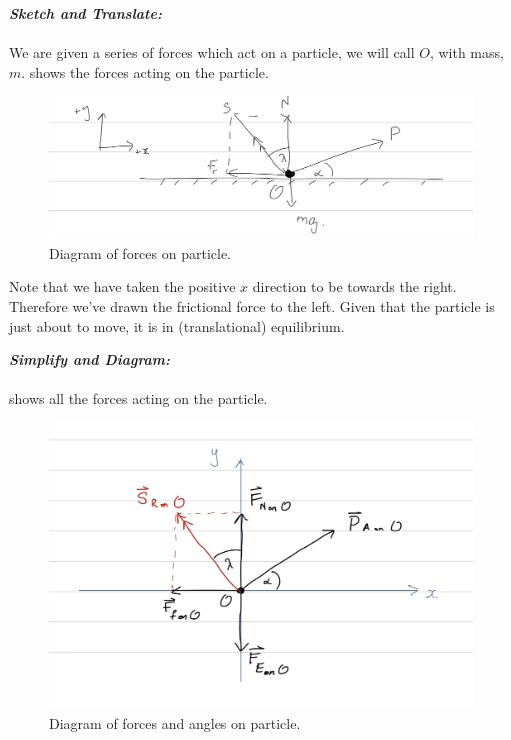 \begin{subquestions}
\begin{subsubquestions}
	\textbf{\textit{Sketch and Translate:}} \\ \\
	We are given a series of forces which act on a particle, we will call $O$, with mass, $m$.  shows the forces acting on the particle.
	\begin{figure} [H]
		\begin{center} 
			\includegraphics[scale=0.25]{../2014/figures/2014q55Sketch}
			\caption{\label{2014:q55:Force1} Diagram of forces on particle.}
		\end{center}
	\end{figure}
	
	Note that we have taken the positive $x$ direction to be towards the right. Therefore we've drawn the frictional force to the left. Given that the particle is just about to move, it is in (translational) equilibrium.
	
	\subsubquestion
	
	\textbf{\textit{Simplify and Diagram:}} \\ \\
	 shows all the forces acting on the particle.
	\begin{figure} [H]
		\begin{center} 
			\includegraphics[scale=0.25]{../2014/figures/2014q55Diagram}
			\caption{\label{2014:q55:Force2} Diagram of forces and angles on particle.}
		\end{center}
	\end{figure}
	

\end{subsubquestions}
\end{subquestions}
